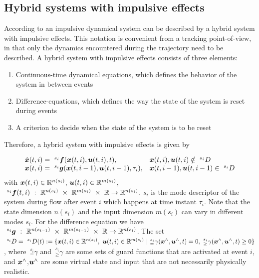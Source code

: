\documentclass[../DC2017114Bouma.tex]{subfiles}
\begin{document}
\subsection{Hybrid systems with impulsive effects}
According to \cite{Haddad2006} an impulsive dynamical system can be described by a hybrid system with impulsive effects. This notation is convenient from a tracking point-of-view, in that only the dynamics encountered during the trajectory need to be described. A hybrid system with impulsive effects consists of three elements:
\begin{enumerate}
\item Continuous-time dynamical equations, which defines the behavior of the system in between events
\item Difference-equations, which defines the way the state of the system is reset during events
\item A criterion to decide when the state of the system is to be reset
\end{enumerate}

Therefore, a hybrid system with impulsive effects is given by

\begin{equation}
\begin{array}{ll}
\dot{{\boldsymbol{x}}}(t,i) =\ ^{s_i}{\boldsymbol{f}}({\boldsymbol{x}}(t,i),{\boldsymbol{u}}(t,i),t),& {\boldsymbol{x}}(t,i),{\boldsymbol{u}}(t,i)\notin \ ^{s_i}D\\
{\boldsymbol{x}}(t,i) = \ ^{s_i}{\boldsymbol{g}}({\boldsymbol{x}}(t,i-1),{\boldsymbol{u}}(t,i-1),\tau_i),& {\boldsymbol{x}}(t,i-1),{\boldsymbol{u}}(t,i-1)\in \ ^{s_i}D
\end{array}\label{eq:hybimp}
\end{equation}
with ${\boldsymbol{x}}(t,i)\in\mathbb{R}^{n(s_i)}$, ${\boldsymbol{u}}(t,i)\in\mathbb{R}^{m(s_i)}$, $\ ^{s_i}\fb(t,i)\ :\ \Rbb^{n(s_i)}\ \times\ \Rbb^{m(s_i)}\ \times\ \Rbb\rightarrow \Rbb^{n(s_i)}$. $s_i$ is the mode descriptor of the system during flow after event $i$ which happens at time instant $\tau_i$. Note that the state dimension $n(s_i)$ and the input dimension $m(s_i)$ can vary in different modes $s_i$. For the difference equation we have $\ ^{s_i}\gb\ :\ \Rbb^{n(s_{i-1})}\ \times\ \Rbb^{m(s_{i-1})}\ \times\ \Rbb\rightarrow \Rbb^{n(s_i)}$. The set $\ ^{s_i}D = \ ^{s_i}D(t) := \{\xb(t,i)\in\Rbb^{n(s_i)},\ \ub(t,i)\in\Rbb^{m(s_i)}\ |\ ^{s_i}_{=}\gamma(\xb^{\wedge},\ub^{\wedge},t) = 0, \ ^{s_i}_{\geq}\gamma(\xb^{\wedge},\ub^{\wedge},t) \geq 0\}$, where $\ ^{s_i}_{=}\gamma$ and $\ ^{s_i}_{\geq}\gamma$ are some sets of guard functions that are activated at event $i$, and ${\boldsymbol{x}}^{\wedge}$,${\boldsymbol{u}}^{\wedge}$ are some virtual state and input that are not necessarily physically realistic.
\end{document}
